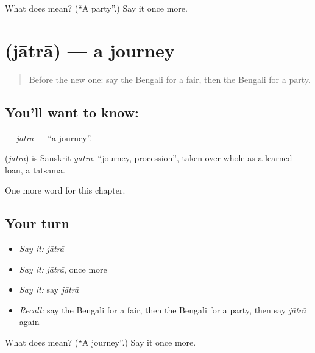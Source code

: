 \begin{tcolorbox}[breakable,colback=teal!4,colframe=teal!35!black,title={Before you move on}]
What does  mean? (\textquotedblleft{}A party\textquotedblright{}.) Say it once more.
\end{tcolorbox}
\section[\texorpdfstring{\bn{যাত্রা} (jātrā)}{যাত্রা (jātrā)}]{ (jātrā) — a journey}

\label{lesson:BN-C251-jatra}



\begin{quote}
Before the new one: say the Bengali for a fair, then the Bengali for a party.
\end{quote}

\subsection*{You'll want to know: }
\textbf{} — \emph{jātrā} — \textquotedblleft{}a journey\textquotedblright{}.

\begin{cousinweb}
\textbf{} (\emph{jātrā}) is Sanskrit \emph{yātrā}, \textquotedblleft{}journey, procession\textquotedblright{}, taken over whole as a learned loan, a tatsama.
\end{cousinweb}

\begin{grammarlens}[title={What you've built}]
One more word for this chapter.
\end{grammarlens}

\subsection*{Your turn}
\begin{itemize}
\raggedright
  \item \emph{Say it:} \emph{jātrā}
  \item \emph{Say it:} \emph{jātrā}, once more
  \item \emph{Say it:} say \emph{jātrā}
  \item \emph{Recall:} say the Bengali for a fair, then the Bengali for a party, then say \emph{jātrā} again
\end{itemize}

\begin{tcolorbox}[breakable,colback=teal!4,colframe=teal!35!black,title={Before you move on}]
What does  mean? (\textquotedblleft{}A journey\textquotedblright{}.) Say it once more.
\end{tcolorbox}
